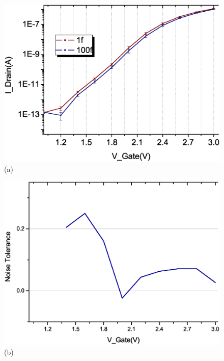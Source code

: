 \begin{figure}[!hbt]
    \centering
    \begin{minipage}[t][20cm][t]{1\textwidth}
        \begin{minipage}[t]{0.5\textwidth}
            \centering
            \includegraphics[scale=0.3]{images/chapter3/208_devices/L2-7_log.eps}
            (a)
        \end{minipage}
        \hfill
        \begin{minipage}[t]{0.5\textwidth}
            \raggedleft
            \includegraphics[scale=0.3]{images/chapter3/208_devices/L2-7_margin.eps}
            \centering
            (b)
        \end{minipage}
        \vfill

\end{minipage}
\end{figure}

